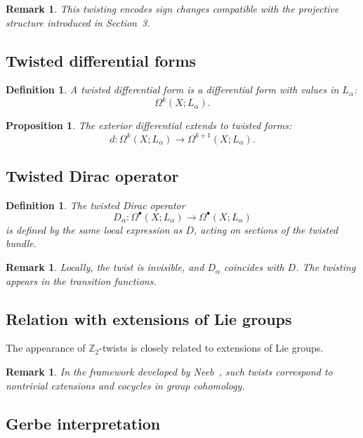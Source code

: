 \documentclass[11pt]{amsart}
\newtheorem{proposition}[theorem]{Proposition}
\newtheorem{definition}[theorem]{Definition}
\newtheorem{remark}[theorem]{Remark}
\begin{document}
\begin{remark}
This twisting encodes sign changes compatible with the projective structure introduced in Section~3.
\end{remark}

\subsection{Twisted differential forms}

\begin{definition}
A twisted differential form is a differential form with values in $L_\alpha$:
\[
\Omega^k(X;L_\alpha).
\]
\end{definition}

\begin{proposition}
The exterior differential extends to twisted forms:
\[
d : \Omega^k(X;L_\alpha) \to \Omega^{k+1}(X;L_\alpha).
\]
\end{proposition}

\subsection{Twisted Dirac operator}

\begin{definition}
The twisted Dirac operator
\[
D_\alpha : \Omega^\bullet(X;L_\alpha) \to \Omega^\bullet(X;L_\alpha)
\]
is defined by the same local expression as $D$, acting on sections of the twisted bundle.
\end{definition}

\begin{remark}
Locally, the twist is invisible, and $D_\alpha$ coincides with $D$. The twisting appears in the transition functions.
\end{remark}

\subsection{Relation with extensions of Lie groups}

The appearance of $\mathbb{Z}_2$-twists is closely related to extensions of Lie groups.

\begin{remark}
In the framework developed by Neeb~\cite{Neeb2007}, such twists correspond to nontrivial extensions and cocycles in group cohomology.
\end{remark}

\subsection{Gerbe interpretation}
\end{document}
